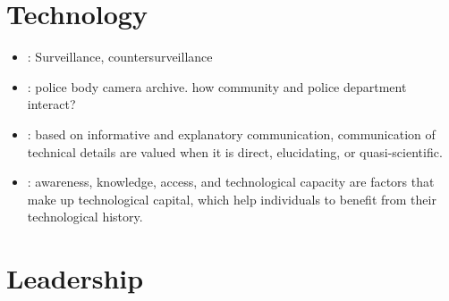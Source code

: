\documentclass[
]{book}
\providecommand{\tightlist}{%
  \setlength{\itemsep}{0pt}\setlength{\parskip}{0pt}}
\begin{document}
\hypertarget{technology}{%
\chapter{Technology}\label{technology}}

\begin{itemize}
\tightlist
\item
  \citep{Ganesh_2016}: Surveillance, countersurveillance
\item
  \citep{Ramirez_2018}: police body camera archive. how community and police department interact?
\item
  \citep{Stephens_2016}: based on informative and explanatory communication, communication of technical details are valued when it is direct, elucidating, or quasi-scientific.
\item
  \citep{Carlson_2018}: awareness, knowledge, access, and technological capacity are factors that make up technological capital, which help individuals to benefit from their technological history.
\end{itemize}

\hypertarget{leadership}{%
\chapter{Leadership}\label{leadership}}

\citep{Fairhurst_1993}
\end{document}
